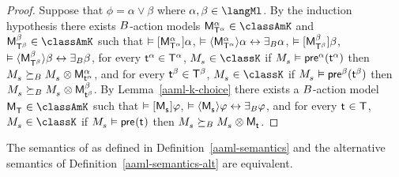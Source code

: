 \begin{proof}
Suppose that $\phi = \alpha \lor \beta$ where $\alpha, \beta \in \langMl$.
By the induction hypothesis there exists $\agentsB$-action models
$\aPModel[\alpha]{\aStatesT[\alpha]} \in \classAmK$ and $\aPModel[\beta]{\aStatesT[\beta]} \in \classAmK$ such that 
$\entails \actionA{\aPModel[\alpha]{\aStatesT[\alpha]}} \alpha$, 
$\entails \actionE{\aPModel[\alpha]{\aStatesT[\alpha]}} \alpha \iff \someactsBs \alpha$, 
$\entails \actionA{\aPModel[\beta]{\aStatesT[\beta]}} \beta$,
$\entails \actionE{\aPModel[\beta]{\aStatesT[\beta]}} \beta \iff \someactsBs \beta$,
for every $\aStateT[\alpha] \in \aStatesT[\alpha]$, $\kPModel{\kStateS} \in \classK$ if $\kPModel{\kStateS} \entails \aPrecondition[\alpha](\aStateT[\alpha])$ then $\kPModel{\kStateS} \simulatesBs \kPModel{\kStateS} \exec \aPModel[\alpha]{\aStateT[\alpha]}$, and
for every $\aStateT[\beta] \in \aStatesT[\beta]$, $\kPModel{\kStateS} \in \classK$ if $\kPModel{\kStateS} \entails \aPrecondition[\beta](\aStateT[\beta])$ then $\kPModel{\kStateS} \simulatesBs \kPModel{\kStateS} \exec \aPModel[\beta]{\aStateT[\beta]}$.
By Lemma~\ref{aaml-k-choice} there exists a $\agentsB$-action model $\aPModel{\aStatesT} \in \classAmK$ such that 
$\entails \actionA{\aPModel{\aStateS}} \phi$,
$\entails \actionE{\aPModel{\aStateS}} \phi \iff \someactsBs \phi$, and
for every $\aStateT \in \aStatesT$, $\kPModel{\kStateS} \in \classK$ if $\kPModel{\kStateS} \entails \aPrecondition(\aStateT)$ then $\kPModel{\kStateS} \simulatesBs \kPModel{\kStateS} \exec \aPModel{\aStateT}$.
\end{proof}

\begin{corollary}\label{aaml-k-semantics-equivalent}
The semantics of \logicAamlK{} as defined in Definition~\ref{aaml-semantics} and the alternative semantics of Definition~\ref{aaml-semantics-alt} are equivalent.
\end{corollary}


